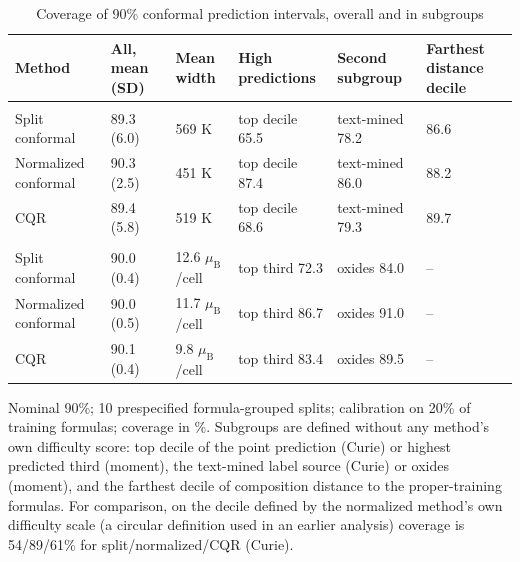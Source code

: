 \begin{table}
\caption{Coverage of 90\% conformal prediction intervals, overall and in subgroups}
\label{tab:table4_regression_intervals}
\tablefont
\begin{tabularx}{\textwidth}{@{}>{\raggedright\arraybackslash}Xlllll@{}}
\toprule
\textbf{Method} & \textbf{All, mean (SD)} & \textbf{Mean width} & \textbf{High predictions} & \textbf{Second subgroup} & \textbf{Farthest distance decile} \\
\midrule
\multicolumn{6}{@{}l@{}}{\textit{Curie temperature}} \\
\quad Split conformal & 89.3 (6.0) & 569 K & top decile 65.5 & text-mined 78.2 & 86.6 \\
\quad Normalized conformal & 90.3 (2.5) & 451 K & top decile 87.4 & text-mined 86.0 & 88.2 \\
\quad CQR & 89.4 (5.8) & 519 K & top decile 68.6 & text-mined 79.3 & 89.7 \\
\addlinespace
\multicolumn{6}{@{}l@{}}{\textit{Moment per cell}} \\
\quad Split conformal & 90.0 (0.4) & 12.6 $\mu_\mathrm{B}$/cell & top third 72.3 & oxides 84.0 & -- \\
\quad Normalized conformal & 90.0 (0.5) & 11.7 $\mu_\mathrm{B}$/cell & top third 86.7 & oxides 91.0 & -- \\
\quad CQR & 90.1 (0.4) & 9.8 $\mu_\mathrm{B}$/cell & top third 83.4 & oxides 89.5 & -- \\
\bottomrule
\end{tabularx}
\par\vspace{4pt}\raggedright\noindent Nominal 90\%; 10 prespecified formula-grouped splits; calibration on 20\% of training formulas; coverage in \%. Subgroups are defined without any method's own difficulty score: top decile of the point prediction (Curie) or highest predicted third (moment), the text-mined label source (Curie) or oxides (moment), and the farthest decile of composition distance to the proper-training formulas. For comparison, on the decile defined by the normalized method's own difficulty scale (a circular definition used in an earlier analysis) coverage is 54/89/61\% for split/normalized/CQR (Curie).
\end{table}
